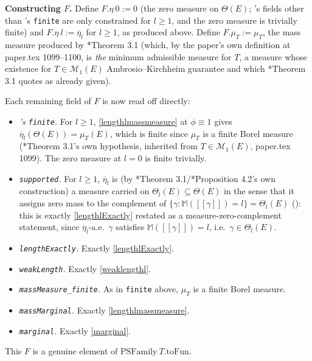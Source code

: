 \begin{definition}
  \textbf{Constructing $F$.} Define $F.\eta\ 0 := 0$ (the zero measure on $\Theta(E)$; 's
  fields other than 's \texttt{finite} are only constrained for $l \ge 1$, and the
  zero measure is trivially finite) and $F.\eta\ l := \overline{\eta}_l$ for $l \ge 1$, as
  produced above. Define $F.\mu_T := \mu_T$, the mass measure produced by \cite{PS}*{Theorem 3.1}
  (which, by the paper's own definition at paper.tex 1099--1100, is \emph{the} minimum admissible
  measure for $T$, a measure whose existence for $T \in \mathcal{M}_1(E)$ Ambrosio--Kirchheim
  guarantee and which \cite{PS}*{Theorem 3.1} quotes as already given).

  Each remaining field of $F$ is now read off directly:
  \begin{itemize}
    \item \emph{'s \texttt{finite}.} For $l \ge 1$, \eqref{lengthlmassmeasure}
      at $\phi \equiv 1$ gives $\overline{\eta}_l(\Theta(E)) = \mu_T(E)$, which is finite since
      $\mu_T$ is a finite Borel measure (\cite{PS}*{Theorem 3.1}'s own hypothesis, inherited from
      $T \in \mathcal{M}_1(E)$, paper.tex 1099). The zero measure at $l = 0$ is finite trivially.
    \item \emph{\texttt{supported}.} For $l \ge 1$, $\overline{\eta}_l$ is (by \cite{PS}*{Theorem
      3.1}/\cite{PS}*{Proposition 4.2}'s own construction) a measure carried on $\Theta_l(E)
      \subseteq \Theta(E)$ in the sense that it assigns zero mass to the complement of
      $\{\gamma : \mathbb{M}([[\gamma]]) = l\} = \Theta_l(E)$ (): this is exactly
      \eqref{lengthlExactly} restated as a measure-zero-complement statement, since
      $\overline{\eta}_l$-a.e.\ $\gamma$ satisfies $\mathbb{M}([[\gamma]]) = l$, i.e.\ $\gamma \in
      \Theta_l(E)$.
    \item \emph{\texttt{lengthExactly}.} Exactly \eqref{lengthlExactly}.
    \item \emph{\texttt{weakLength}.} Exactly \eqref{weaklengthl}.
    \item \emph{\texttt{massMeasure\_finite}.} As in \texttt{finite} above, $\mu_T$ is a finite
      Borel measure.
    \item \emph{\texttt{massMarginal}.} Exactly \eqref{lengthlmassmeasure}.
    \item \emph{\texttt{marginal}.} Exactly \eqref{marginal}.
  \end{itemize}
  This $F$ is a genuine element of $\mathrm{PSFamily}\ T.\mathrm{toFun}$.


\end{definition}
